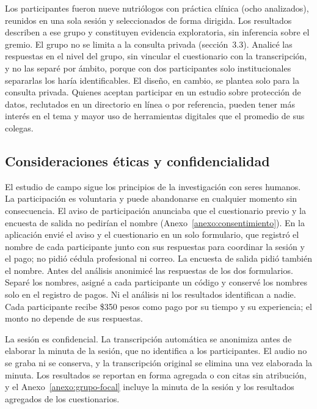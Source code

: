 \documentclass[12pt, a4paper]{article}
\begin{document}
Los participantes fueron nueve nutriólogos con práctica clínica (ocho
analizados), reunidos en una sola sesión y seleccionados de forma
dirigida. Los
resultados describen a ese grupo y constituyen evidencia exploratoria,
sin inferencia sobre el gremio. El grupo no se limita a la consulta
privada (sección~3.3). Analicé las respuestas en el nivel del grupo, sin vincular el cuestionario con la transcripción, y no las separé por ámbito, porque con dos participantes solo institucionales separarlas los haría identificables. El diseño, en cambio, se plantea solo para
la consulta privada. Quienes aceptan participar en un estudio
sobre protección de datos, reclutados en un directorio en línea o por referencia, pueden
tener más interés en el tema y mayor uso de herramientas digitales que
el promedio de sus colegas.
 
\subsection{Consideraciones éticas y confidencialidad}
 
El estudio de campo sigue los principios de la investigación con seres
humanos. La participación es voluntaria y puede abandonarse en cualquier
momento sin consecuencia. El aviso de participación anunciaba que el cuestionario previo y la encuesta de salida no pedirían el nombre (Anexo~\ref{anexo:consentimiento}). En la aplicación envié el
aviso y el cuestionario en un solo
formulario, que registró el nombre de cada participante junto con sus
respuestas para coordinar la sesión y el pago; no pidió cédula
profesional ni correo. La encuesta de salida pidió también el nombre. Antes del análisis anonimicé las respuestas de los dos formularios. Separé los nombres, asigné a cada participante un código y conservé los
nombres solo en el registro de pagos. Ni el análisis ni los
resultados identifican a nadie. Cada participante recibe \$350
pesos como pago por su tiempo y su experiencia; el monto no depende de
sus respuestas.

La sesión es confidencial. La transcripción automática se anonimiza
antes de elaborar la minuta de la sesión, que no identifica a los
participantes. El audio no se graba ni se conserva, y la transcripción
original se elimina una vez elaborada la minuta. Los resultados se
reportan en forma agregada o con citas sin atribución, y el
Anexo~\ref{anexo:grupo-focal} incluye la minuta de la sesión y los
resultados agregados de los cuestionarios.
 
\end{document}
